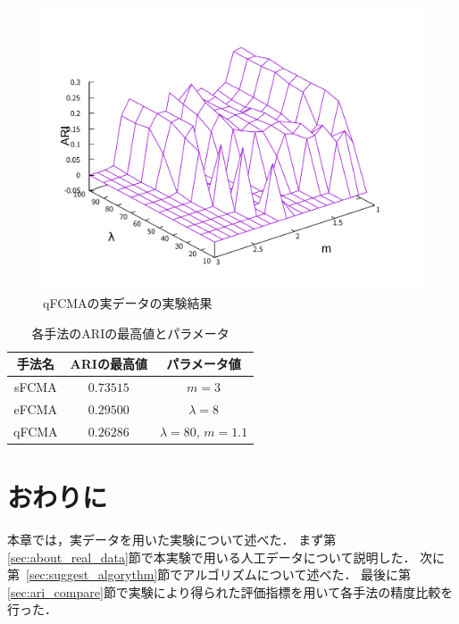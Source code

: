 \documentclass[a4j,12pt,dvipdfmx,oneside]{jsbook}
\theoremstyle{definition}
\begin{document}
\begin{figure}[h]
\begin{minipage}{0.43\hsize}
    \includegraphics[width=\linewidth]{qFCMA_ARI.pdf}
    \caption{qFCMAの実データの実験結果}
    \label{fig:qFCMA_ARI}
   \end{minipage}
  \end{figure}

  \begin{table}[h]
   \centering
   \caption{各手法のARIの最高値とパラメータ}
   \begin{center}
    \begin{tabular}{ c || c | c }\hline
     手法名 & ARIの最高値 & パラメータ値\\ \hline \hline
     sFCMA & $0.73515$ & $m = 3$\\ \hline
     eFCMA & $0.29500$& $\lambda = 8$\\ \hline  
     qFCMA & $0.26286$ & $\lambda = 80$, $m = 1.1$\\  \hline
    \end{tabular}
    \label{tbl:max_ari}
   \end{center}
  \end{table}


  \section{おわりに}\label{sec:real_data_summary}
  本章では，実データを用いた実験について述べた．
  まず第\ref{sec:about_real_data}節で本実験で用いる人工データについて説明した．
  次に第~\ref{sec:suggest_algorythm}節でアルゴリズムについて述べた．
  最後に第\ref{sec:ari_compare}節で実験により得られた評価指標を用いて各手法の精度比較を行った．
  
\end{document}
